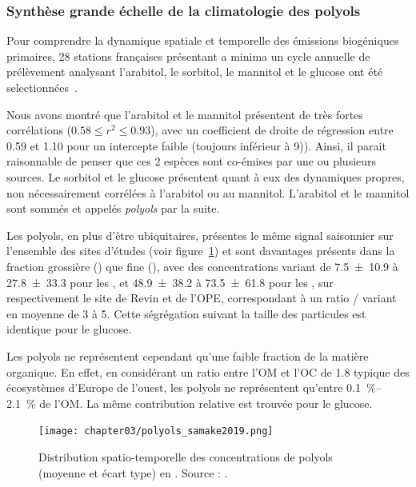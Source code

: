 \subsubsection{Synthèse grande échelle de la climatologie des polyols}%
\label{ssub:synthèse_grande_échelle_de_la_climatologie_des_polyols}

Pour comprendre la dynamique spatiale et temporelle des émissions biogéniques primaires,
28 stations françaises présentant a minima un cycle annuelle de prélèvement analysant
l'arabitol, le sorbitol, le mannitol et le glucose ont été
selectionnées~\autocite{samakePolyols2019}.

Nous avons montré que l'arabitol et le mannitol présentent de très fortes corrélations 
($0.58 \leq r^2 \leq 0.93$), avec un coefficient de droite de régression entre 0.59 et
1.10 pour un intercepte faible (toujours inférieur à \SI{9}{\ngm})). Ainsi, il parait
raisonnable de penser que ces 2 espèces sont co-émises par une ou plusieurs sources.
Le sorbitol et le glucose présentent quant à eux des dynamiques propres, non
nécessairement corrélées à l'arabitol ou au mannitol.
L'arabitol et le mannitol sont sommés et appelés \textit{polyols} par la suite.

Les polyols, en plus d'être ubiquitaires, présentes le même signal saisonnier sur l'ensemble
des sites d'études (voir figure~\ref{fig:polyols_samake2019}) et sont davantages présents
dans la fraction grossière (\PMdix) que fine (\PMdc), avec des concentrations variant de 
\SI{7.5\pm10.9}{\ngm} à \SI{27.8\pm33.3}{\ngm} pour les \PMdc, et
\SI{48.9\pm38.2}{\ngm} à \SI{73.5\pm61.8}{\ngm} pour les \PMdix, sur respectivement le site de
Revin et de l'OPE, correspondant à un ratio \PMdix/\PMdc{} variant en moyenne de 3 à 5.
Cette ségrégation suivant la taille des particules est identique pour le glucose.

Les polyols ne représentent cependant qu'une faible fraction de la matière organique. En
effet, en considérant un ratio entre l'OM et l'OC de 1.8 typique des écosystèmes d'Europe
de l'ouest, les polyols ne représentent qu'entre \SIrange{0.1}{2.1}{\percent} de l'OM. La
même contribution relative est trouvée pour le glucose.

\begin{figure}[ht]
    \centering
    \texttt{[image: chapter03/polyols\_samake2019.png]}
    \caption{
        Distribution spatio-temporelle des concentrations de polyols (moyenne et écart
        type) en \si{\ngm}.
        Source : \cite[figure 6]{samakePolyols2019}.
    }%
    \label{fig:polyols_samake2019}
\end{figure}


